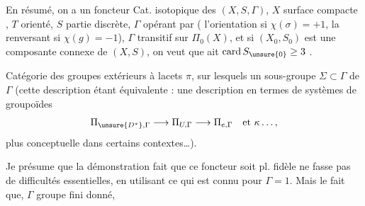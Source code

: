 En résumé, on a un foncteur 
Cat. isotopique des \((X,S,\Gamma)\), \(X\) surface compacte ,
\(T\) orienté, \(S\) partie discrète, \(\Gamma\) opérant par 
(\inserted{\(\sigma\in\Gamma\)} l'orientation si \(\chi(\sigma)=+1\), la renversant
si \(\chi(g)=-1\)), \(\Gamma\) transitif sur \(\Pi_0(X)\),
 et si \((X_0,S_0)\) est une composante connexe
de \((X,S)\), on veut que 
ait \(\operatorname{card} S_{\unsure{0}}\geq 3\) .


Catégorie des groupes extérieurs à lacets \(\pi\),
sur lesquels un sous-groupe \(\Sigma\subset\Gamma\) de \(\Gamma\) 
(cette description étant
équivalente : une description en termes
de systèmes de groupoïdes
\[
\Pi_{\unsure{D^*},\Gamma}\longrightarrow\Pi_{U,\Gamma}
\longrightarrow\Pi_{e,\Gamma}\quad\text{et }\kappa\ldots,
\]
plus conceptuelle dans certains contextes\ldots).

 Je présume que la démonstration
 fait que ce foncteur soit pl. fidèle
ne fasse pas de difficultés essentielles,
en utilisant ce qui est connu pour
\(\Gamma=1\). Mais le fait que,  \(\Gamma\) groupe
fini donné, 

